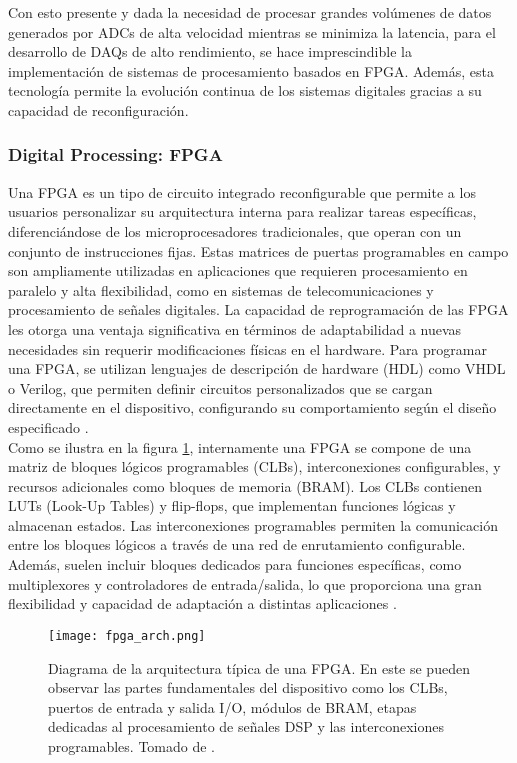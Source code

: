 \documentclass{report}
\begin{document}
\noindent Con esto presente y dada la necesidad de procesar grandes volúmenes de datos generados por ADCs de alta velocidad mientras se minimiza la latencia, para el desarrollo de DAQs de alto rendimiento, se hace imprescindible la implementación de sistemas de procesamiento basados en FPGA. Además, esta tecnología permite la evolución continua de los sistemas digitales gracias a su capacidad de reconfiguración.

\subsubsection{Digital Processing: FPGA}
\noindent Una FPGA es un tipo de circuito integrado reconfigurable que permite a los usuarios personalizar su arquitectura interna para realizar tareas específicas, diferenciándose de los microprocesadores tradicionales, que operan con un conjunto de instrucciones fijas. Estas matrices de puertas programables en campo son ampliamente utilizadas en aplicaciones que requieren procesamiento en paralelo y alta flexibilidad, como en sistemas de telecomunicaciones y procesamiento de señales digitales. La capacidad de reprogramación de las FPGA les otorga una ventaja significativa en términos de adaptabilidad a nuevas necesidades sin requerir modificaciones físicas en el hardware. Para programar una FPGA, se utilizan lenguajes de descripción de hardware (HDL) como VHDL o Verilog, que permiten definir circuitos personalizados que se cargan directamente en el dispositivo, configurando su comportamiento según el diseño especificado \cite{brown2000fundamentals}.\\

\noindent Como se ilustra en la figura \ref{fig:fpga_arch}, internamente una FPGA se compone de una matriz de bloques lógicos programables (CLBs), interconexiones configurables, y recursos adicionales como bloques de memoria (BRAM). Los CLBs contienen LUTs (Look-Up Tables) y flip-flops, que implementan funciones lógicas y almacenan estados. Las interconexiones programables permiten la comunicación entre los bloques lógicos a través de una red de enrutamiento configurable. Además, suelen incluir bloques dedicados para funciones específicas, como multiplexores y controladores de entrada/salida, lo que proporciona una gran flexibilidad y capacidad de adaptación a distintas aplicaciones \cite{bravo2020new}.\\

\begin{figure}[h]
    \centering
    \texttt{[image: fpga\_arch.png]}
    \caption{Diagrama de la arquitectura típica de una FPGA. En este se pueden observar las partes fundamentales del dispositivo como los CLBs, puertos de entrada y salida I/O, módulos de BRAM, etapas dedicadas al procesamiento de señales DSP y las interconexiones programables. Tomado de \cite{Rucci2018heterogeneos}.}
    \label{fig:fpga_arch}
\end{figure}
\end{document}

